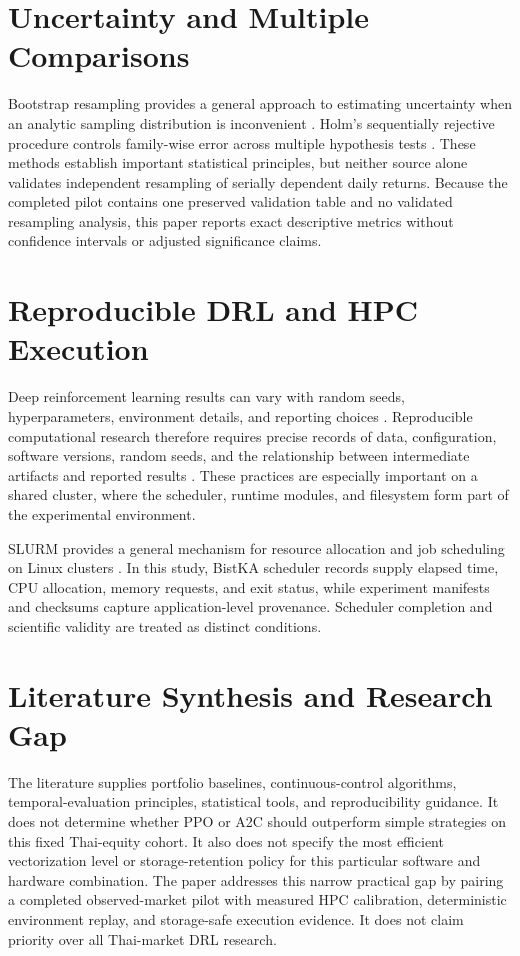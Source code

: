 \documentclass[12pt,a4paper,oneside]{book}
\begin{document}
\section{Uncertainty and Multiple Comparisons}

Bootstrap resampling provides a general approach to estimating uncertainty when an analytic sampling distribution is inconvenient \cite{efron1979bootstrap}. Holm's sequentially rejective procedure controls family-wise error across multiple hypothesis tests \cite{holm1979}. These methods establish important statistical principles, but neither source alone validates independent resampling of serially dependent daily returns. Because the completed pilot contains one preserved validation table and no validated resampling analysis, this paper reports exact descriptive metrics without confidence intervals or adjusted significance claims.

\section{Reproducible DRL and HPC Execution}

Deep reinforcement learning results can vary with random seeds, hyperparameters, environment details, and reporting choices \cite{henderson2018drl}. Reproducible computational research therefore requires precise records of data, configuration, software versions, random seeds, and the relationship between intermediate artifacts and reported results \cite{sandve2013reproducible}. These practices are especially important on a shared cluster, where the scheduler, runtime modules, and filesystem form part of the experimental environment.

SLURM provides a general mechanism for resource allocation and job scheduling on Linux clusters \cite{yoo2003slurm}. In this study, BistKA scheduler records supply elapsed time, CPU allocation, memory requests, and exit status, while experiment manifests and checksums capture application-level provenance. Scheduler completion and scientific validity are treated as distinct conditions.

\section{Literature Synthesis and Research Gap}

The literature supplies portfolio baselines, continuous-control algorithms, temporal-evaluation principles, statistical tools, and reproducibility guidance. It does not determine whether PPO or A2C should outperform simple strategies on this fixed Thai-equity cohort. It also does not specify the most efficient vectorization level or storage-retention policy for this particular software and hardware combination. The paper addresses this narrow practical gap by pairing a completed observed-market pilot with measured HPC calibration, deterministic environment replay, and storage-safe execution evidence. It does not claim priority over all Thai-market DRL research.
\end{document}
